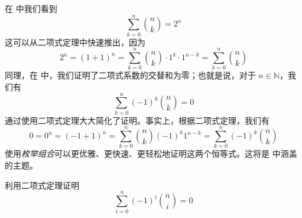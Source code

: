 \begin{example}
在  中我们看到
\[ \sum_{k=0}^n \binom{n}{k} = 2^n \]
这可以从二项式定理中快速推出，因为
\[ 2^n = (1+1)^n = \sum_{k=0}^n \binom{n}{k} \cdot 1^k \cdot 1^{n-k} = \sum_{k=0}^n \binom{n}{k} \]
同理，在  中，我们证明了二项式系数的交替和为零；也就是说，对于 $n \in \mathbb{N}$，我们有
\[ \sum_{k=0}^n (-1)^k \binom{n}{k} = 0 \]
通过使用二项式定理大大简化了证明。事实上，根据二项式定理，我们有
\[ 0 = 0^n = (-1+1)^n = \sum_{k=0}^n \binom{n}{k}(-1)^k1^{n-k} = \sum_{k=0}^n (-1)^k \binom{n}{k} \]
使用\textit{枚举组合}可以更优雅、更快速、更轻松地证明这两个恒等式。这将是  中涵盖的主题。
\end{example}

\begin{exercise}
利用二项式定理证明
\[ \sum_{i=0}^n (-1)^i \binom{n}{i} = 0 \]
\end{exercise}

